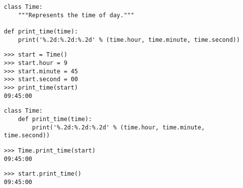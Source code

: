 \begin{lstlisting}
class Time:
    """Represents the time of day."""

def print_time(time):
    print('%.2d:%.2d:%.2d' % (time.hour, time.minute, time.second))
\end{lstlisting}


\begin{lstlisting}
>>> start = Time()
>>> start.hour = 9
>>> start.minute = 45
>>> start.second = 00
>>> print_time(start)
09:45:00
\end{lstlisting}


\begin{lstlisting}
class Time:
    def print_time(time):
        print('%.2d:%.2d:%.2d' % (time.hour, time.minute, time.second))
\end{lstlisting}


\begin{lstlisting}
>>> Time.print_time(start)
09:45:00
\end{lstlisting}



\begin{lstlisting}
>>> start.print_time()
09:45:00
\end{lstlisting}



